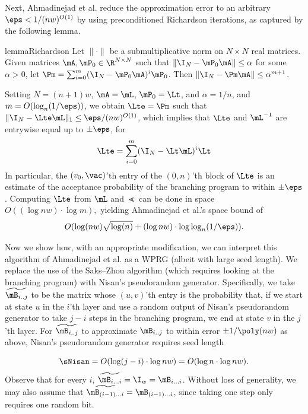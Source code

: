    Next, %
Ahmadinejad  %
et al. reduce the approximation error to an arbitrary $\eps<1/(nw)^{O(1)}$ by using preconditioned Richardson iterations, as captured by the following lemma. %
   
   
    \begin{restatable}{lemma}{Richardson}
    \label{lem:richardson}
    Let $\|\cdot\|$ be a submultiplicative norm on $N\times N$ real matrices. Given matrices $\mA,\mP_0\in \R^{N\times N}$ such that $\|\I_N-\mP_0\mA\|\leq \alpha$ for some $\alpha >0$, let $\Pm=\sum_{i=0}^m(\I_N-\mP_0\mA)^i\mP_0$. Then $\|\I_N-\Pm \mA\|\leq \alpha^{m+1}$.
    \end{restatable}
    
    Setting $N=(n+1)w$, $\mA=\mL$, $\mP_0=\Lt$, and $\alpha=1/n$, and
    $m=O(\log_{n}(1/\eps))$, we obtain $\Lte=\Pm$ such that
    $\|\I_N-\Lte \mL\|_1\leq \eps/(nw)^{O(1)}$, which implies that $\Lte$ and $\mL^{-1}$ are entrywise equal up to $\pm \eps$, for
    \begin{equation}
        \Lte = \sum_{i=0}^m(\I_N-\Lt\mL)^i\Lt \label{eqn:iterated_L}
    \end{equation}
    In particular, the $(v_0,\vac)$'th entry of the $(0,n)$'th block of $\Lte$ is an estimate of the acceptance probability of the branching program to within $\pm \eps$.  Computing $\Lte$ from $\mL$ and $\Lt$ 
    can be done in space $O((\log nw)\cdot \log m),$ yielding 
%
Ahmadinejad  %
et al.'s space bound of 
    $$O(\log(nw)\sqrt{\log(n)} + (\log nw)\cdot \log \log_{n}(1/\eps)).$$
    
Now we show how, with an appropriate modification, we can interpret this algorithm of
%
Ahmadinejad  %
et al. as a WPRG (albeit with large seed length).
    We replace the use of the Saks--Zhou algorithm (which requires looking at the branching program) with Nisan's pseudorandom generator.  Specifically, we take 
    $\widetilde{\mB_{i .. j}}$ to be the matrix whose $(u,v)$'th entry
    is the probability that, if we start at state $u$ in %
    the $i$'th layer and
    use a random output of Nisan's pseudorandom generator to take $j-i$ steps in the branching program, we end at state $v$ in the $j$'th layer.  For 
    $\widetilde{\mB_{i .. j}}$ to approximate $\mB_{i .. j}$ to within error $\pm 1/\poly(nw)$ as above, Nisan's pseudorandom generator requires seed length 
    
    $$\sNisan = O(\log(j-i)\cdot \log nw) = O(\log n\cdot \log nw).$$
    Observe that for every $i$, $\widetilde{\mB_{i\ldots i}} = \I_w = \mB_{i\ldots i}$. Without loss of generality, we may also assume that
    $\widetilde{\mB_{(i-1)\ldots i}}=\mB_{(i-1)\ldots i}$, since taking one step only requires one random bit.  
    
